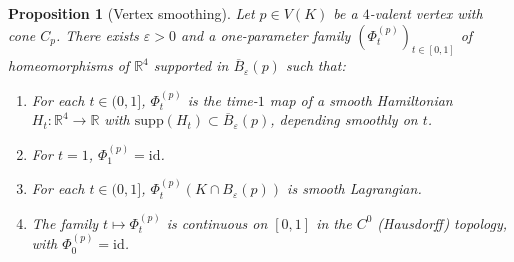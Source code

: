 \documentclass[12pt]{article}
\newtheorem{proposition}[theorem]{Proposition}
\theoremstyle{definition}
\begin{document}
\begin{proposition}[Vertex smoothing]\label{prop:vertex}
Let $p\in V(K)$ be a $4$-valent vertex with cone $C_p$. There exists $\varepsilon>0$ and a one-parameter family $(\Phi_t^{(p)})_{t\in[0,1]}$ of homeomorphisms of $\mathbb{R}^4$ supported in $\overline{B}_\varepsilon(p)$ such that:
\begin{enumerate}
\item For each $t\in(0,1]$, $\Phi_t^{(p)}$ is the time-$1$ map of a smooth Hamiltonian $H_t:\mathbb{R}^4\to\mathbb{R}$ with $\mathrm{supp}(H_t)\subset\overline{B}_\varepsilon(p)$, depending smoothly on $t$.
\item For $t=1$, $\Phi_1^{(p)}=\mathrm{id}$.
\item For each $t\in(0,1]$, $\Phi_t^{(p)}(K\cap B_\varepsilon(p))$ is smooth Lagrangian.
\item The family $t\mapsto\Phi_t^{(p)}$ is continuous on $[0,1]$ in the $C^0$ (Hausdorff) topology, with $\Phi_0^{(p)}=\mathrm{id}$.
\end{enumerate}
\end{proposition}
\end{document}
